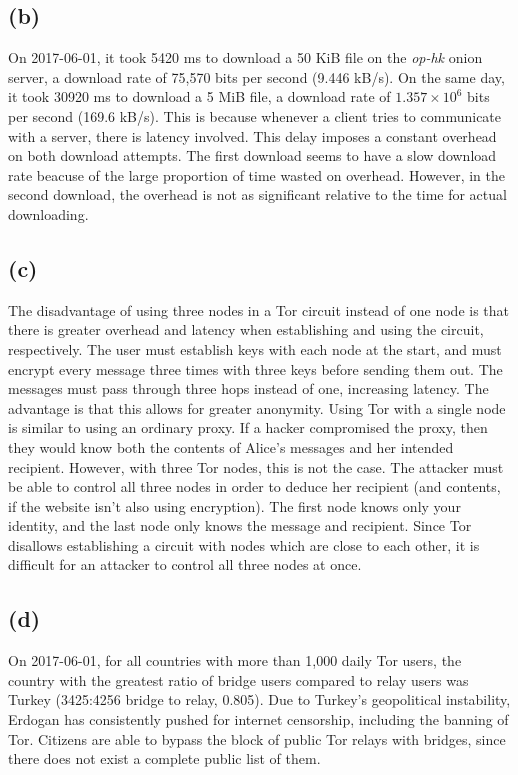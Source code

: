 \documentclass{article}
\begin{document}
\subsection*{(b)}
On 2017-06-01, it took 5420 ms to download a 50 KiB file on the \textit{op-hk} onion server, a download rate of 75,570 bits per second (9.446 kB/s). On the same day, it took 30920 ms to download a 5 MiB file, a download rate of $1.357\times 10^6$ bits per second (169.6 kB/s). This is because whenever a client tries to communicate with a server, there is latency involved. This delay imposes a constant overhead on both download attempts. The first download seems to have a slow download rate beacuse of the large proportion of time wasted on overhead. However, in the second download, the overhead is not as significant relative to the time for actual downloading. 
\subsection*{(c)}
The disadvantage of using three nodes in a Tor circuit instead of one node is that there is greater overhead and latency when establishing and using the circuit, respectively. The user must establish keys with each node at the start, and must encrypt every message three times with three keys before sending them out. The messages must pass through three hops instead of one, increasing latency. \newline\newline
The advantage is that this allows for greater anonymity. Using Tor with a single node is similar to using an ordinary proxy. If a hacker compromised the proxy, then they would know both the contents of Alice's messages and her intended recipient. However, with three Tor nodes, this is not the case. The attacker must be able to control all three nodes in order to deduce her recipient (and contents, if the website isn't also using encryption). The first node knows only your identity, and the last node only knows the message and recipient. Since Tor disallows establishing a circuit with nodes which are close to each other, it is difficult for an attacker to control all three nodes at once. 
\subsection*{(d)}
On 2017-06-01, for all countries with more than 1,000 daily Tor users, the country with the greatest ratio of bridge users compared to relay users was Turkey (3425:4256 bridge to relay, 0.805). Due to Turkey's geopolitical instability, Erdogan has consistently pushed for internet censorship, including the banning of Tor. Citizens are able to bypass the block of public Tor relays with bridges, since there does not exist a complete public list of them. 
\end{document}
